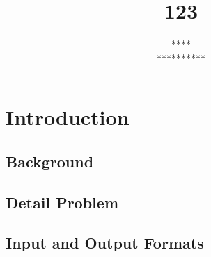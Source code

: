 \documentclass[10pt, twoside]{article}
\title{
    123
}
\author{
    \ifIsPR
        ****\\
        **********
    \else
        \authorname\\
        \authorID
    \fi
}
\begin{document}

\begin{titlingpage}
    \maketitle
    \thispagestyle{empty}
\end{titlingpage}
\newpage

\section{Introduction}
\subsection{Background}

\lipsum[1]

\subsection{Detail Problem}

\lipsum[2-3]

\subsection{Input and Output Formats}

\lipsum[4]
\end{document}
